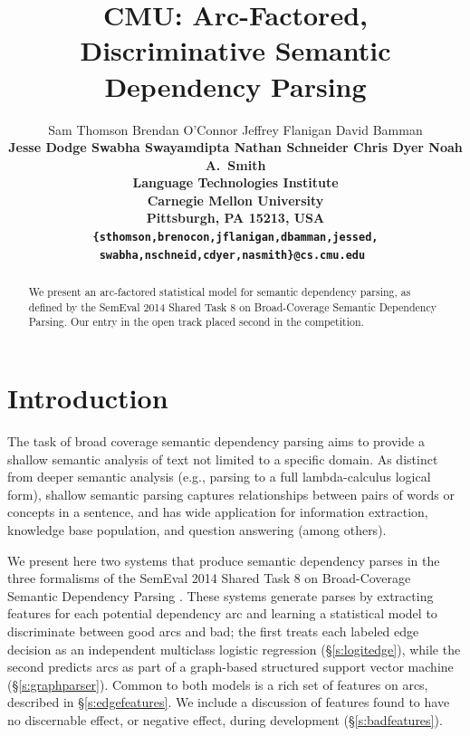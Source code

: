 \documentclass[11pt]{article}
\title{CMU: Arc-Factored, Discriminative Semantic Dependency Parsing}
\author{
	Sam Thomson \quad
	Brendan O'Connor \quad
	Jeffrey Flanigan \quad
	David Bamman \quad  \\
	\bf{Jesse Dodge \quad
	Swabha Swayamdipta \quad
	Nathan Schneider \quad
	Chris Dyer \quad
	Noah A.~Smith} \\
  Language Technologies Institute \\
  Carnegie Mellon University \\
  Pittsburgh, PA 15213, USA \\
  {\tt\{sthomson,brenocon,jflanigan,dbamman,jessed,}\\
   \tt{swabha,nschneid,cdyer,nasmith\}@cs.cmu.edu}
}
\date{}
\begin{document}
\maketitle

\begin{abstract}
We present an arc-factored statistical model for
semantic dependency parsing, as defined by the SemEval 2014 Shared
Task 8 on
Broad-Coverage Semantic Dependency Parsing.    Our entry in the open
track placed second in the competition.
\end{abstract}



\section{Introduction}

The task of broad coverage semantic dependency parsing aims to provide a
shallow semantic analysis of text not limited to a specific domain.
As distinct from deeper semantic analysis (e.g., parsing to a full
lambda-calculus logical form), shallow semantic parsing captures relationships
between pairs of words or concepts in a sentence, and has wide application for
information extraction, knowledge base population, and question answering (among others).

We present here two systems that produce semantic dependency parses in the three formalisms of the SemEval 2014 Shared Task 8 on Broad-Coverage Semantic Dependency
Parsing \citep{oepens_broad_2014}.  These systems generate parses by extracting
features for each potential dependency arc and learning a statistical model to
discriminate between good arcs and bad;
the first treats each labeled edge decision as an independent multiclass
logistic regression (\S\ref{s:logitedge}), while the second predicts arcs
as part of a graph-based structured support vector machine (\S\ref{s:graphparser}).
Common to both models is a rich set of features on arcs, described in
\S\ref{s:edgefeatures}.  We include a discussion of features found to
have no discernable effect, or negative effect, during development (\S\ref{s:badfeatures}).
\end{document}

